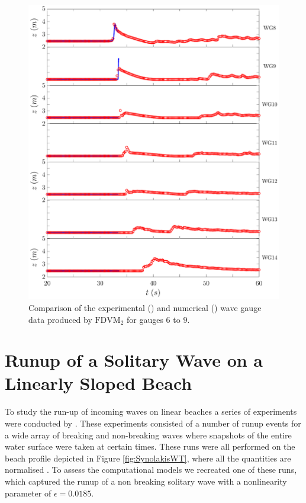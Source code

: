 \begin{figure}
	\centering
	\includegraphics[width=\textwidth]{./chp6/figures/Experiment/Roeber/Trial8/FDVM/LongWGs2.pdf}
	\caption{Comparison of the experimental () and numerical ({\color{blue}\solidrule}) wave gauge data produced by $\text{FDVM}_2$ for gauges $6$ to $9$.}
	\label{fig:Roeber8WG6to9FDVM}
\end{figure} 

\section{Runup of a Solitary Wave on a Linearly Sloped Beach}
To study the run-up of incoming waves on linear beaches a series of experiments were conducted by \citet{Synolakis-1987-523}. These experiments consisted of a number of runup events for a wide array of breaking and non-breaking waves where snapshots of the entire water surface were taken at certain times. These runs were all performed on the beach profile depicted in Figure \ref{fig:SynolakisWT}, where all the quantities are normalised \cite{Synolakis-1987-523}. To assess the computational models we recreated one of these runs, which captured the runup of a non breaking solitary wave with a nonlinearity parameter of $\epsilon = 0.0185$.

